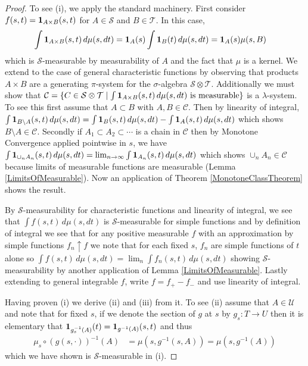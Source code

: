 \begin{proof}
To see (i), we apply the standard machinery.  First consider $f(s,t) = \textbf{1}_{A\times B}(s,t)$
for $A \in \mathcal{S}$ and $B \in \mathcal{T}$.  In this case, 
\begin{align*}
\int \textbf{1}_{A \times B} (s, t) \, d\mu(s,dt) &=
\textbf{1}_{A} (s)\int \textbf{1}_{B} (t) \, d\mu(s,dt)
=\textbf{1}_{A} (s) \mu(s,B)
\end{align*}
which is $\mathcal{S}$-measurable by measurability of $A$ and the fact
that $\mu$ is a kernel.  We extend to the case of general characteristic
functions by observing that products $A \times B$ are a generating
$\pi$-system for the $\sigma$-algebra $\mathcal{S} \otimes
\mathcal{T}$.  Additionally we must show that $\mathcal{C} = \lbrace C
\in \mathcal{S} \otimes \mathcal{T} \mid \int \textbf{1}_{A \times
  B} (s, t) \, d\mu(s,dt) \text { is measurable} \rbrace$ is a
$\lambda$-system.  To see this first assume that $A \subset B$ with
$A,B \in \mathcal{C}$.  Then by linearity of integral, $\int
\textbf{1}_{B \setminus A} (s, t) \, d\mu(s,dt) = \int
\textbf{1}_{B} (s, t) \, d\mu(s,dt) - \int
\textbf{1}_{A} (s, t) \, d\mu(s,dt)$ which shows $B \setminus A \in
\mathcal{C}$.  Secondly if $A_1 \subset A_2 \subset \cdots$ is a chain
in $\mathcal{C}$ then by Monotone Convergence applied pointwise in
$s$, we have $\int \textbf{1}_{\cup_n A_n} (s, t) \, d\mu(s,dt) =
\lim_{n\to \infty} \int \textbf{1}_{A_n} (s, t) \, d\mu(s,dt)$
which shows $\cup_n A_n \in \mathcal{C}$ because limits of measurable functions are measurable
(Lemma \ref{LimitsOfMeasurable}).  Now an application of Theorem
\ref{MonotoneClassTheorem} shows the result.

By $\mathcal{S}$-measurability for characteristic functions and
linearity of integral, we see that $\int f (s, t) \, d\mu(s,dt)$ is
$\mathcal{S}$-measurable for simple functions and by definition of
integral we see that for any positive measurable $f$ with an
approximation by simple functions $f_n \uparrow f$ we note that for
each fixed $s$, $f_n$ are simple functions of $t$ alone so $\int f (s,
t) \, d\mu(s,dt) = \lim_{n} \int f_n (s,
t) \, d\mu(s,dt)$ showing $\mathcal{S}$-measurability by another
application of Lemma \ref{LimitsOfMeasurable}.  Lastly extending to
general integrable $f$, write $f = f_+ - f_-$ and use linearity of
integral.

Having proven (i) we derive (ii) and (iii) from it.  To see (ii)
assume that $A \in \mathcal{U}$ and note that for fixed $s$, if we
denote the section of $g$ at $s$ by $g_s : T \to U$ then it is
elementary that $\textbf{1}_{g_s^{-1}(A)}(t) =
\textbf{1}_{g^{-1}(A)}(s,t)$ and thus
\begin{align*}
\mu_s \circ (g(s, \cdot))^{-1}(A) &= \mu(s, g^{-1}(s, A)) = \mu(s, g^{-1}(A)) 
\end{align*}
which we have shown is $\mathcal{S}$-measurable in (i).


\end{proof}
